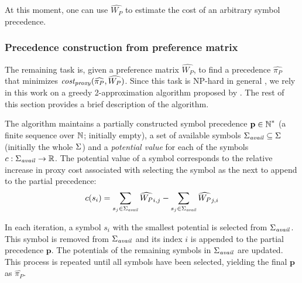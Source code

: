 \documentclass[a4paper]{easychair}
\begin{document}
At this moment, one can use \(\widehat{W_P}\) to estimate the cost of an arbitrary symbol precedence.

\subsubsection{Precedence construction from preference matrix} \label{sect:ltot}

The remaining task is, given a preference matrix \(\widehat{W_P}\), to find a precedence \(\widehat{\pi_P}\)
that minimizes \(\operatorname{\mathit{cost_{proxy}}}(\widehat{\pi_P}, \widehat{W_P})\).
Since this task is NP-hard in general \cite{Cohen2011},
we rely in this work on a greedy 2-approximation algorithm
proposed by \citet{Cohen2011}.
The rest of this section provides a brief description of the algorithm.

The algorithm maintains a partially constructed symbol precedence \(\mathbf{p} \in \operatorname{\mathbb{N}}^*\)
(a finite sequence over \(\operatorname{\mathbb{N}}\); initially empty),
a set of available symbols \(\operatorname{\Sigma}_{\mathit{avail}} \subseteq \operatorname{\Sigma}\) (initially the whole \(\operatorname{\Sigma}\))
and a \emph{potential value} for each of the symbols \(c: \operatorname{\Sigma}_{\mathit{avail}} \to \operatorname{\mathbb{R}}\).
The potential value of a symbol corresponds to the relative increase in proxy cost
associated with selecting the symbol as the next to append to the partial precedence:
\begin{align*}
c(s_i) = \sum_{s_j \in \operatorname{\Sigma}_{\mathit{avail}}} \widehat{W_P}_{i, j} - \sum_{s_j \in \operatorname{\Sigma}_{\mathit{avail}}} \widehat{W_P}_{j, i}
\end{align*}

In each iteration, a symbol \(s_i\) with the smallest potential is selected from \(\operatorname{\Sigma}_{\mathit{avail}}\).
This symbol is removed from \(\operatorname{\Sigma}_{\mathit{avail}}\)
and its index \(i\) is appended to the partial precedence \(\mathbf{p}\).
The potentials of the remaining symbols in \(\operatorname{\Sigma}_{\mathit{avail}}\) are updated.
This process is repeated until all symbols have been selected,
yielding the final \(\mathbf{p}\) as \(\widehat{\pi_P}\).


\end{document}
